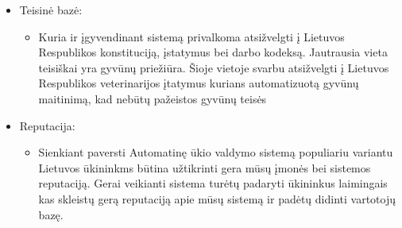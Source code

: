 \documentclass[oneside]{VUMIFPSkursinis}
\begin{document}
\begin{itemize}
\begin{itemize}
		\end{itemize}
		\item{Teisinė bazė: }
		\begin{itemize}
			\item{Kuria ir įgyvendinant sistemą privalkoma atsižvelgti į Lietuvos Respublikos konstituciją, įstatymus bei darbo kodeksą. Jautrausia vieta teisiškai yra gyvūnų priežiūra. Šioje vietoje svarbu atsižvelgti į Lietuvos Respublikos veterinarijos įtatymus kurians automatizuotą gyvūnų maitinimą, kad nebūtų pažeistos gyvūnų teisės }
		\end{itemize}
		\item{Reputacija: }
		\begin{itemize}
			\item{Sienkiant paversti Automatinę ūkio valdymo sistemą populiariu variantu Lietuvos ūkininkms būtina užtikrinti gera mūsų įmonės bei sistemos reputaciją. Gerai veikianti sistema turėtų padaryti ūkininkus laimingais kas skleistų gerą reputaciją apie mūsų sistemą ir padėtų didinti vartotojų bazę. }
		\end{itemize}
	\end{itemize}
	
	
\end{document}
